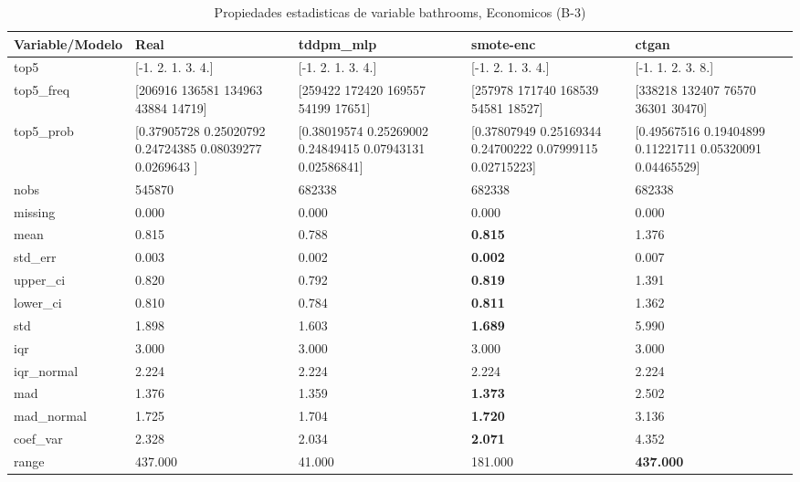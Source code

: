 \begin{table}[H]
\centering
\fontsize{8}{14}\selectfont
\caption{Propiedades  estadisticas de variable bathrooms, Economicos (B-3)}
\label{table-stats-economicos-b-3-bathrooms}
\begin{tabular}{|l|m{10em}|m{10em}|m{10em}|m{10em}|}
\hline
 \rowcolor[gray]{0.8}
Variable/Modelo & Real & tddpm\_mlp & smote-enc & ctgan \\
\hline top5 & [-1.  2.  1.  3.  4.] & [-1.  2.  1.  3.  4.] & [-1.  2.  1.  3.  4.] & [-1.  1.  2.  3.  8.] \\
\hline top5\_freq & [206916 136581 134963  43884  14719] & [259422 172420 169557  54199  17651] & [257978 171740 168539  54581  18527] & [338218 132407  76570  36301  30470] \\
\hline top5\_prob & [0.37905728 0.25020792 0.24724385 0.08039277 0.0269643 ] & [0.38019574 0.25269002 0.24849415 0.07943131 0.02586841] & [0.37807949 0.25169344 0.24700222 0.07999115 0.02715223] & [0.49567516 0.19404899 0.11221711 0.05320091 0.04465529] \\
\hline nobs & 545870 & 682338 & 682338 & 682338 \\
\hline missing & 0.000 & 0.000 & 0.000 & 0.000 \\
\hline mean & 0.815 & 0.788 & \bfseries 0.815 & \cellcolor[rgb]{0.9, 0.54, 0.52} 1.376 \\
\hline std\_err & 0.003 & 0.002 & \bfseries 0.002 & \cellcolor[rgb]{0.9, 0.54, 0.52} 0.007 \\
\hline upper\_ci & 0.820 & 0.792 & \bfseries 0.819 & \cellcolor[rgb]{0.9, 0.54, 0.52} 1.391 \\
\hline lower\_ci & 0.810 & 0.784 & \bfseries 0.811 & \cellcolor[rgb]{0.9, 0.54, 0.52} 1.362 \\
\hline std & 1.898 & 1.603 & \bfseries 1.689 & \cellcolor[rgb]{0.9, 0.54, 0.52} 5.990 \\
\hline iqr & 3.000 & 3.000 & 3.000 & 3.000 \\
\hline iqr\_normal & 2.224 & 2.224 & 2.224 & 2.224 \\
\hline mad & 1.376 & 1.359 & \bfseries 1.373 & \cellcolor[rgb]{0.9, 0.54, 0.52} 2.502 \\
\hline mad\_normal & 1.725 & 1.704 & \bfseries 1.720 & \cellcolor[rgb]{0.9, 0.54, 0.52} 3.136 \\
\hline coef\_var & 2.328 & 2.034 & \bfseries 2.071 & \cellcolor[rgb]{0.9, 0.54, 0.52} 4.352 \\
\hline range & 437.000 & \cellcolor[rgb]{0.9, 0.54, 0.52} 41.000 & 181.000 & \bfseries 437.000 \\

\end{tabular}
\end{table}
